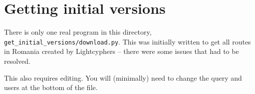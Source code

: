 \section{Getting initial versions}
There is only one real program in this directory, \verb"get_initial_versions/download.py". This was initially written to get all routes in Romania created by Lightcyphers -- there were some issues that had to be resolved.

This also requires editing. You will (minimally) need to change the query and users at the bottom of the file.
